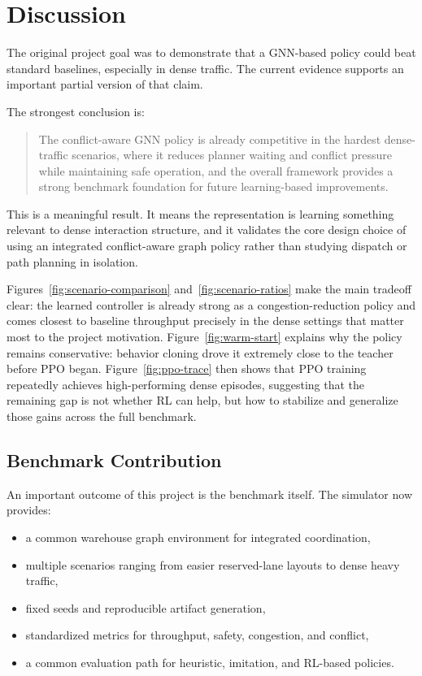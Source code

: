 \documentclass[11pt]{article}
\begin{document}
\section{Discussion}
The original project goal was to demonstrate that a GNN-based policy could beat standard baselines, especially in dense traffic. The current evidence supports an important partial version of that claim.

The strongest conclusion is:
\begin{quote}
The conflict-aware GNN policy is already competitive in the hardest dense-traffic scenarios, where it reduces planner waiting and conflict pressure while maintaining safe operation, and the overall framework provides a strong benchmark foundation for future learning-based improvements.
\end{quote}

This is a meaningful result. It means the representation is learning something relevant to dense interaction structure, and it validates the core design choice of using an integrated conflict-aware graph policy rather than studying dispatch or path planning in isolation.

Figures~\ref{fig:scenario-comparison} and~\ref{fig:scenario-ratios} make the main tradeoff clear: the learned controller is already strong as a congestion-reduction policy and comes closest to baseline throughput precisely in the dense settings that matter most to the project motivation. Figure~\ref{fig:warm-start} explains why the policy remains conservative: behavior cloning drove it extremely close to the teacher before PPO began. Figure~\ref{fig:ppo-trace} then shows that PPO training repeatedly achieves high-performing dense episodes, suggesting that the remaining gap is not whether RL can help, but how to stabilize and generalize those gains across the full benchmark.

\subsection{Benchmark Contribution}
An important outcome of this project is the benchmark itself. The simulator now provides:
\begin{itemize}[leftmargin=1.5em]
    \item a common warehouse graph environment for integrated coordination,
    \item multiple scenarios ranging from easier reserved-lane layouts to dense heavy traffic,
    \item fixed seeds and reproducible artifact generation,
    \item standardized metrics for throughput, safety, congestion, and conflict,
    \item a common evaluation path for heuristic, imitation, and RL-based policies.
\end{itemize}
\end{document}
